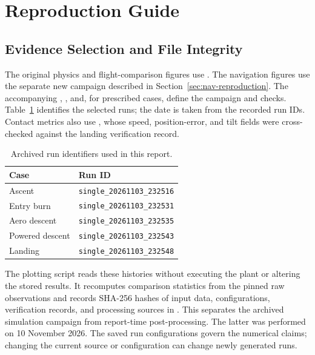 \documentclass[11pt,letterpaper]{article}
\newcommand{\code}[1]{\texttt{#1}}
\begin{document}
\appendix
\clearpage
\section{Reproduction Guide}\label{app:reproduction}
\subsection{Evidence Selection and File Integrity}
The original physics and flight-comparison figures use . The navigation figures use the separate new campaign described in Section~\ref{sec:nav-reproduction}. The accompanying , , and, for prescribed cases,  define the campaign and checks. Table~\ref{tab:runs} identifies the selected runs; the date is taken from the recorded run IDs. Contact metrics also use , whose speed, position-error, and tilt fields were cross-checked against the landing verification record.
\begin{table}[!htbp]
\centering\small\caption{Archived run identifiers used in this report.}\label{tab:runs}
\begin{tabular}{ll}\toprule Case & Run ID\\\midrule
Ascent & \code{single\_20261103\_232516}\\
Entry burn & \code{single\_20261103\_232531}\\
Aero descent & \code{single\_20261103\_232535}\\
Powered descent & \code{single\_20261103\_232543}\\
Landing & \code{single\_20261103\_232548}\\\bottomrule
\end{tabular}
\end{table}

The plotting script  reads these histories without executing the plant or altering the stored results. It recomputes comparison statistics from the pinned raw observations and records SHA-256 hashes of input data, configurations, verification records, and processing sources in . This separates the archived simulation campaign from report-time post-processing. The latter was performed on 10 November 2026. The saved run configurations govern the numerical claims; changing the current source or configuration can change newly generated runs.
\end{document}
